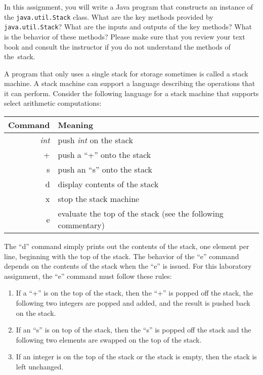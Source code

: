   In this assignment, you will write a Java program that constructs an instance of the {\tt java.util.Stack} class. What
  are the key methods provided by {\tt java.util.Stack}? What are the inputs and outputs of the key methods? What is
  the behavior of these methods? Please make sure that you review your text book and consult the instructor if you do
  not understand the methods of \mbox{the stack}.
  
  A program that only uses a single stack for storage sometimes is called a stack machine. A stack machine can support a
  language describing the operations that it can perform. Consider the following language for a stack machine that
  supports select arithmetic computations:

\begin{tabular}{r | l}
Command & Meaning \\ \hline
\emph{int} & push \emph{int} on the stack \\
+ & push a ``+'' onto the stack \\
s & push an ``s'' onto the stack \\
d & display contents of the stack \\
x & stop the stack machine \\ 
e & evaluate the top of the stack (see the following commentary) \\
\end{tabular}

  The ``d'' command simply prints out the contents of the stack, one element per line, beginning with the top of the
  stack. The behavior of the ``e'' command depends on the contents of the stack when the ``e'' is issued. For this
  laboratory assignment, the ``e'' command must follow these rules:

\begin{enumerate}

  \item If a ``+'' is on the top of the stack, then the ``+'' is popped off the stack, the following two integers are
    popped and added, and the result is pushed back on the stack.  
  
  \item If an ``s'' is on top of the stack, then the ``s'' is popped off the stack and the following two elements are
    swapped on the top of the stack.  
  
  \item If an integer is on the top of the stack or the stack is empty, then the stack is left unchanged.  

\end{enumerate}

